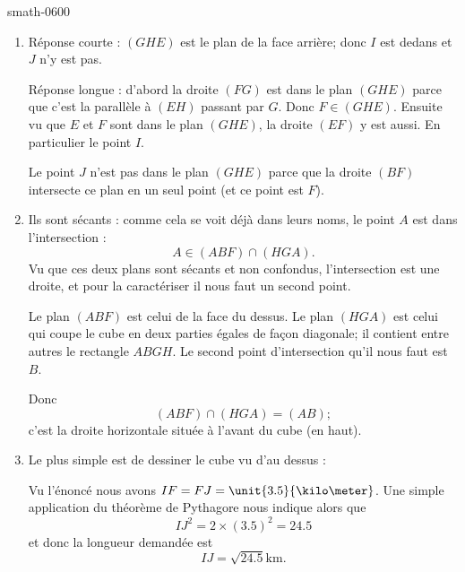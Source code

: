 
\begin{corrige}{smath-0600}

    \begin{enumerate}
        \item
            Réponse courte : \( (GHE)\) est le plan de la face arrière; donc \( I\) est dedans et \( J\) n'y est pas.

            Réponse longue : d'abord la droite \( (FG)\) est dans le plan \( (GHE)\) parce que c'est la parallèle à \( (EH)\) passant par \( G\). Donc \( F\in (GHE)\). Ensuite vu que \( E\) et \( F\) sont dans le plan \( (GHE)\), la droite \( (EF)\) y est aussi. En particulier le point \( I\).

            Le point \( J\) n'est pas dans le plan \( (GHE)\) parce que la droite \( (BF)\) intersecte ce plan en un seul point (et ce point est \( F\)).

        \item
            Ils sont sécants : comme cela se voit déjà dans leurs noms, le point \( A\) est dans l'intersection :
            \begin{equation}
                A\in (ABF)\cap(HGA).
            \end{equation}
            Vu que ces deux plans sont sécants et non confondus, l'intersection est une droite, et pour la caractériser il nous faut un second point.

            Le plan \( (ABF)\) est celui de la face du dessus. Le plan \( (HGA)\) est celui qui coupe le cube en deux parties égales de façon diagonale; il contient entre autres le rectangle \( ABGH\). Le second point d'intersection qu'il nous faut est \( B\).

            Donc
            \begin{equation}
                (ABF)\cap(HGA)=(AB);
            \end{equation}
            c'est la droite horizontale située à l'avant du cube (en haut).

        \item   \label{ItemECveWvo}
            Le plus simple est de dessiner le cube vu d'au dessus :
            \begin{center}
                
            \end{center}
            Vu l'énoncé nous avons \( IF=FJ=\unit{3.5}{\kilo\meter}\). Une simple application du théorème de Pythagore nous indique alors que
            \begin{equation}
                IJ^2=2\times (3.5)^2=24.5
            \end{equation}
            et donc la longueur demandée est
            \begin{equation}
                IJ=\sqrt{24.5}\si{\kilo\meter}.
            \end{equation}
            
    \end{enumerate}

\end{corrige}
